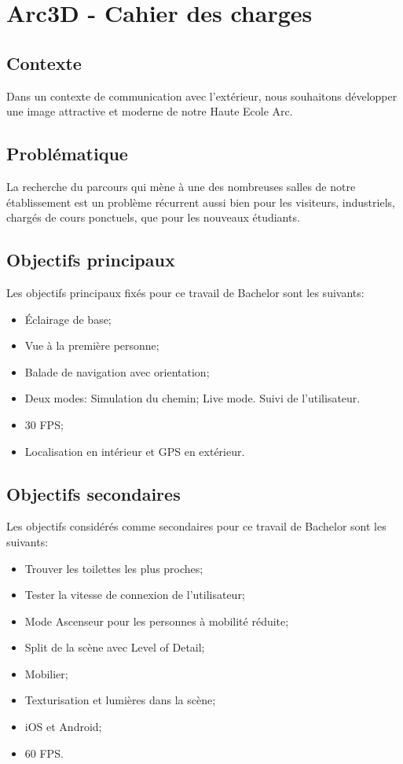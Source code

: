 \documentclass{article}
\begin{document}
	\section{Arc3D - Cahier des charges}
	
	\subsection{Contexte}
	Dans un contexte de communication avec l’extérieur, nous souhaitons développer une image attractive et moderne de notre Haute Ecole Arc.
	
	\subsection{Problématique}
	La recherche du parcours qui mène à une des nombreuses salles de notre établissement est un problème récurrent aussi bien pour les visiteurs, industriels, chargés de cours ponctuels, que pour les nouveaux étudiants.
	
	\subsection{Objectifs principaux}
	Les objectifs principaux fixés pour ce travail de Bachelor sont les suivants:
	\begin{itemize}
		\item Éclairage de base;
		\item Vue à la première personne;
		\item Balade de navigation avec orientation;
		\item Deux modes:
		\subitem Simulation du chemin;
		\subitem Live mode. Suivi de l'utilisateur.
		\item 30 FPS;
		\item Localisation en intérieur et GPS en extérieur.
	\end{itemize}
	
	\subsection{Objectifs secondaires}
	Les objectifs considérés comme secondaires pour ce travail de Bachelor sont les suivants:
	\begin{itemize}
		\item Trouver les toilettes les plus proches;
		\item Tester la vitesse de connexion de l'utilisateur;
		\item Mode Ascenseur pour les personnes à mobilité réduite;
		\item Split de la scène avec Level of Detail;
		\item Mobilier;
		\item Texturisation et lumières dans la scène;
		\item iOS  et Android;
		\item 60 FPS.
	\end{itemize}
	
\end{document}
